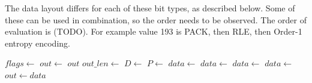 \documentclass[a4paper]{article}
\begin{document}
The data layout differs for each of these bit types, as described
below.  Some of these can be used in combination, so the order needs
to be observed.  The order of evaluation is (TODO).  For example value
193 is PACK, then RLE, then Order-1 entropy encoding.

\begin{algorithmic}[1]
  \State $flags \gets $
   
    \State $out \gets $
    \Return $out$
  \EndIf{}
  \Statex
   
    \State $out\_len \gets$
  \EndIf
   
    \State $D \gets $
  \EndIf
   
    \State $P \gets $
  \EndIf
   
    \State $data \gets $
  \EndIf
   
     
      \State $data \gets $
    \Else
      \State $data \gets $
    \EndIf
  \EndIf
   
    \State $data \gets $
  \EndIf
  \State $out \gets data$
  \EndFunction
\end{algorithmic}
\end{document}
